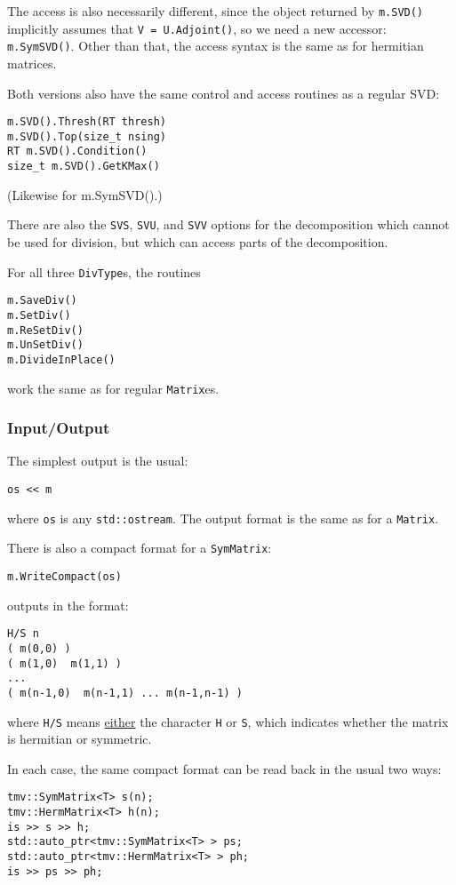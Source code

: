 \documentclass[twoside,letterpaper,11pt]{article}
\renewcommand{\tt}[1]{{\texttt {#1}}}
\begin{document}
\begin{enumerate}
The access is also necessarily different, since the object returned by 
\tt{m.SVD()} implicitly assumes that \tt{V = U.Adjoint()}, so we need a 
new accessor: \tt{m.SymSVD()}.  Other than that, the access syntax is 
the same as for hermitian matrices.

Both versions also have the same control and access routines as a regular SVD:
\begin{verbatim}
m.SVD().Thresh(RT thresh)
m.SVD().Top(size_t nsing)
RT m.SVD().Condition()
size_t m.SVD().GetKMax()
\end{verbatim}
(Likewise for m.SymSVD().)

There are also the \tt{SVS}, \tt{SVU}, and \tt{SVV} options for the decomposition
which cannot be used for division, but which can access parts of the decomposition.

\end{enumerate}

For all three \tt{DivType}s, the routines 
\begin{verbatim}
m.SaveDiv()
m.SetDiv()
m.ReSetDiv()
m.UnSetDiv()
m.DivideInPlace()
\end{verbatim}
work the same as for regular \tt{Matrix}es.

\subsubsection{Input/Output}

The simplest output is the usual:
\begin{verbatim}
os << m
\end{verbatim}
where \tt{os} is any \tt{std::ostream}.
The output format is the same as for a \tt{Matrix}.

There is also a compact format for a \tt{SymMatrix}:
\begin{verbatim}
m.WriteCompact(os)
\end{verbatim}
outputs in the format:
\begin{verbatim}
H/S n 
( m(0,0) )
( m(1,0)  m(1,1) )
...
( m(n-1,0)  m(n-1,1) ... m(n-1,n-1) )
\end{verbatim}
where \tt{H/S} means \underline{either} the character \tt{H} or \tt{S}, which indicates whether 
the matrix is hermitian or symmetric.

In each case, the same compact format can be read back in the usual two ways:
\begin{verbatim}
tmv::SymMatrix<T> s(n);
tmv::HermMatrix<T> h(n);
is >> s >> h;
std::auto_ptr<tmv::SymMatrix<T> > ps;
std::auto_ptr<tmv::HermMatrix<T> > ph;
is >> ps >> ph;
\end{verbatim}
\end{document}
